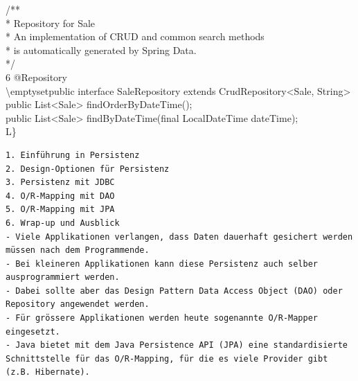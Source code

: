 /**\\
* Repository for Sale\\
* An implementation of CRUD and common search methods\\
* is automatically generated by Spring Data.\\
*/\\
6 @Repository\\
\textbackslash emptysetpublic interface SaleRepository extends CrudRepository<Sale, String>\\
public List<Sale> findOrderByDateTime();\\
public List<Sale> findByDateTime(final LocalDateTime dateTime);\\
L\}

\begin{verbatim}
1. Einführung in Persistenz
2. Design-Optionen für Persistenz
3. Persistenz mit JDBC
4. O/R-Mapping mit DAO
5. O/R-Mapping mit JPA
6. Wrap-up und Ausblick
- Viele Applikationen verlangen, dass Daten dauerhaft gesichert werden müssen nach dem Programmende.
- Bei kleineren Applikationen kann diese Persistenz auch selber ausprogrammiert werden.
- Dabei sollte aber das Design Pattern Data Access Object (DAO) oder Repository angewendet werden.
- Für grössere Applikationen werden heute sogenannte O/R-Mapper eingesetzt.
- Java bietet mit dem Java Persistence API (JPA) eine standardisierte Schnittstelle für das O/R-Mapping, für die es viele Provider gibt (z.B. Hibernate).
\end{verbatim}
